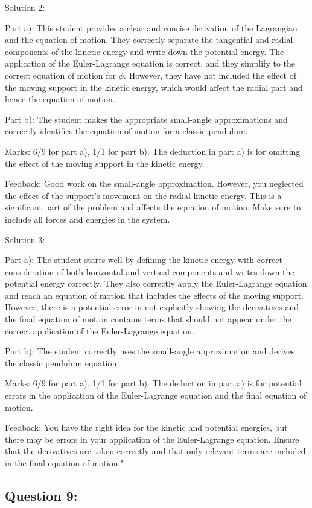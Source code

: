 \documentclass[a4paper,11pt]{article}
\begin{document}
Solution 2:

Part a): This student provides a clear and concise derivation of the Lagrangian and the equation of motion. They correctly separate the tangential and radial components of the kinetic energy and write down the potential energy. The application of the Euler-Lagrange equation is correct, and they simplify to the correct equation of motion for \(\phi\). However, they have not included the effect of the moving support in the kinetic energy, which would affect the radial part and hence the equation of motion.

Part b): The student makes the appropriate small-angle approximations and correctly identifies the equation of motion for a classic pendulum.

Marks: 6/9 for part a), 1/1 for part 
b). The deduction in part a) is for omitting the effect of the moving support in the kinetic energy.

Feedback: Good work on the small-angle approximation. However, you neglected the effect of the support's movement on the radial kinetic energy. This is a significant part of the problem and affects the equation of motion. Make sure to include all forces and energies in the system.

Solution 3:

Part a): The student starts well by defining the kinetic energy with correct consideration of both horizontal and vertical components and writes down the potential energy correctly. They also correctly apply the Euler-Lagrange equation and reach an equation of motion that includes the effects of the moving support. However, there is a potential error in not explicitly showing the derivatives and the final equation of motion contains terms that should not appear under the correct application of the Euler-Lagrange equation.

Part b): The student correctly uses the small-angle approximation and derives the classic pendulum equation.

Marks: 6/9 for part a), 1/1 for part b). The deduction in part a) is for potential errors in the application of the Euler-Lagrange equation and the final equation of motion.

Feedback: You have the right idea for the kinetic and potential energies, but there may be errors in your application of the Euler-Lagrange equation. Ensure that the derivatives are taken correctly and that only relevant terms are included in the final equation of motion."

\subsection*{Question 9:}
\end{document}
